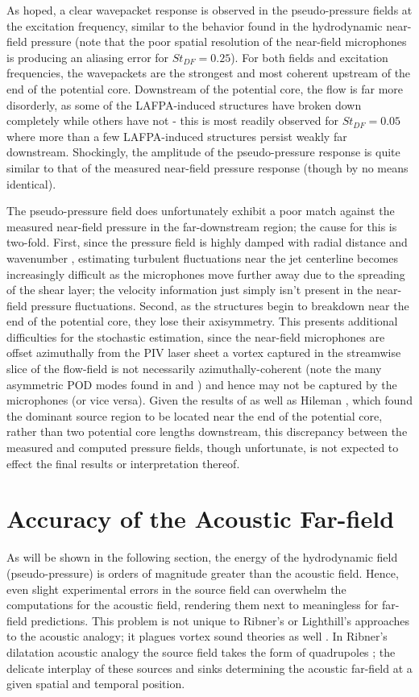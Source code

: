 As hoped, a clear wavepacket response is observed in the pseudo-pressure fields at the excitation frequency, similar to the behavior found in the hydrodynamic near-field pressure (note that the poor spatial resolution of the near-field microphones is producing an aliasing error for $St_{DF}=0.25$).
For both fields and excitation frequencies, the wavepackets are the strongest and most coherent upstream of the end of the potential core.
Downstream of the potential core, the flow is far more disorderly, as some of the LAFPA-induced structures have broken down completely while others have not - this is most readily observed for $St_{DF}=0.05$ where more than a few LAFPA-induced structures persist weakly far downstream.
Shockingly, the amplitude of the pseudo-pressure response is quite similar to that of the measured near-field pressure response (though by no means identical).

The pseudo-pressure field does unfortunately exhibit a poor match against the measured near-field pressure in the far-downstream region; the cause for this is two-fold.
First, since the pressure field is highly damped with radial distance and wavenumber \citep{Arndt1997}, estimating turbulent fluctuations near the jet centerline becomes increasingly difficult as the microphones move further away due to the spreading of the shear layer; the velocity information just simply isn't present in the near-field pressure fluctuations.
Second, as the structures begin to breakdown near the end of the potential core, they lose their axisymmetry.
This presents additional difficulties for the stochastic estimation, since the near-field microphones are offset azimuthally from the PIV laser sheet a vortex captured in the streamwise slice of the flow-field is not
necessarily azimuthally-coherent (note the many asymmetric POD modes found in  and ) and hence may not be captured by the microphones (or vice versa).
Given the results of  as well as Hileman \etal \citep{Hileman2005}, which found the dominant source region to be located near the end of the potential core, rather than two potential core lengths downstream, this discrepancy between the measured and computed pressure fields, though unfortunate, is not expected to effect the final results or interpretation thereof.  

\section{Accuracy of the Acoustic Far-field}
As will be shown in the following section, the energy of the hydrodynamic field (pseudo-pressure) is orders of magnitude greater than the acoustic field.
Hence, even slight experimental errors in the source field can overwhelm the computations for the acoustic field, rendering them next to meaningless for far-field predictions.
This problem is not unique to Ribner's or Lighthill's approaches to the acoustic analogy; it plagues vortex sound theories as well \citep{Bridges1992}.
In Ribner's dilatation acoustic analogy the source field takes the form of quadrupoles \citep{Ristorcelli1997}; the delicate interplay of these sources and sinks determining the acoustic far-field at a given spatial and temporal position.

